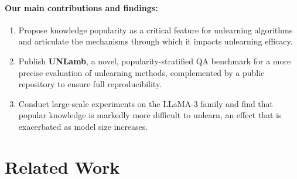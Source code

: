 \documentclass[11pt]{article}
\begin{document}
\paragraph{Our main contributions and findings:}
\begin{enumerate}
    \item Propose knowledge popularity as a critical feature for unlearning algorithms and articulate the mechanisms through which it impacts unlearning efficacy.
    \item Publish \textbf{UNLamb}, a novel, popularity-stratified QA benchmark for a more precise evaluation of unlearning methods, complemented by a public repository to ensure full reproducibility.
    \item Conduct large-scale experiments on the LLaMA-3 family and find that popular knowledge is markedly more difficult to unlearn, an effect that is exacerbated as model size increases.
\end{enumerate}





\section{Related Work}
\label{sec:rw}
\end{document}
